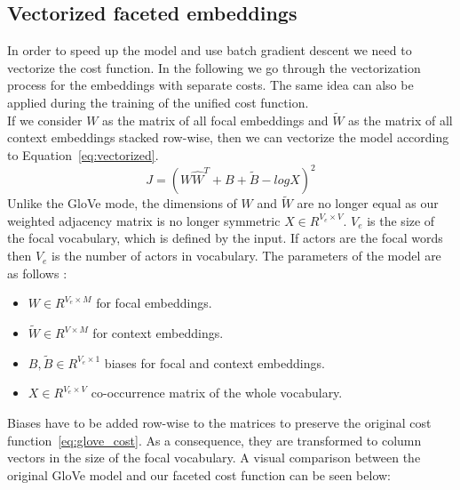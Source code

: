 \subsection{Vectorized faceted embeddings}
In order to speed up the model and use batch gradient descent we need to vectorize the cost function. In the following we go through the vectorization process for the embeddings with separate costs. The same idea can also be applied during the training of the unified cost function.\\
If we consider $W$ as the matrix of all focal embeddings and $\tilde{ W } $ as the matrix of all context embeddings stacked row-wise, then we can vectorize the model according to Equation~\ref{eq:vectorized}. 
\begin{equation}
J=(W \hat{  W }^{ T } +B+\tilde{ B } -log{ X })^{ 2 }
\label{eq:vectorized}
\end{equation}
Unlike the GloVe mode, the dimensions of  $W$ and $\tilde{ W } $ are no longer equal as our weighted adjacency matrix is no longer symmetric $X \in R^{V_e\times V} $.  $V_e$ is the size of the focal vocabulary, which is defined by the input. If actors are the focal words then $V_e$ is the number of actors in vocabulary. The parameters of the model are as follows : 
\begin{itemize}
\item $W \in R^{V_e \times M} $ for focal embeddings.
 \item $\tilde{ W }  \in R^{V \times M} $ for context embeddings.
\item $B,\tilde{B} \in R^{V_e \times 1}$ biases for focal and context embeddings.
\item $X \in R^{V_e\times V} $ co-occurrence matrix of the whole vocabulary. 
\end{itemize}
Biases have to be added row-wise to the matrices to preserve the original cost function~\ref{eq:glove_cost}. As a consequence, they are transformed to column vectors in the size of the focal vocabulary. A visual comparison between the original GloVe model and our faceted cost function can be seen below:\\
